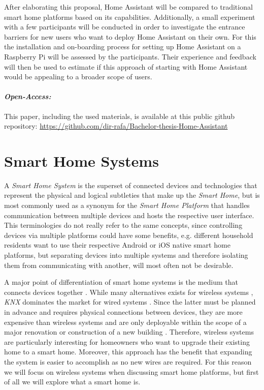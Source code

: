 After elaborating this proposal, Home Assistant will be compared to traditional smart home platforms based on its capabilities. Additionally, a small experiment with a few participants will be conducted in order to investigate the entrance barriers for new users who want to deploy Home Assistant on their own. For this the installation and on-boarding process for setting up Home Assistant on a Raspberry Pi will be assessed by the participants. Their experience and feedback will then be used to estimate if this approach of starting with Home Assistant would be appealing to a broader scope of users.

\paragraph{\textit{Open-Access:}}
\label{thesis:github_repo}
This paper, including the used materials, is available at this public github repository: \href{https://github.com/dir-rafa/Bachelor-thesis-Home-Assistant}{https://github.com/dir-rafa/Bachelor-thesis-Home-Assistant}

\newpage


\section{Smart Home Systems}
A \textit{Smart Home System} is the superset of connected devices and technologies that represent the physical and logical subtleties that make up the \textit{Smart Home}, but is most commonly used as a synonym for the \textit{Smart Home Platform} that handles communication between multiple devices and hosts the respective user interface.
This terminologies do not really refer to the same concepts, since controlling devices via multiple platforms could have some benefits, e.g. different household residents want to use their respective Android or iOS native smart home platforms, but separating devices into multiple systems and therefore isolating them from communicating with another, will most often not be desirable.

A major point of differentiation of smart home systems is the medium that connects devices together \cite{ReviewOfSmartHomes-6177682}. While many alternatives exists for wireless systems \cite{ReviewOfSmartHomes-6177682}, \textit{KNX} dominates the market for wired systems \cite{BertkoChris2017HSH:}. Since the latter must be planned in advance and requires physical connections between devices, they are more expensive than wireless systems and are only deployable within the scope of a major renovation or construction of a new building \cite{BertkoChris2017HSH:}. Therefore, wireless systems are particularly interesting for homeowners who want to upgrade their existing home to a smart home. Moreover, this approach has the benefit that expanding the system is easier to accomplish as no new wires are required. For this reason we will focus on wireless systems when discussing smart home platforms, but first of all we will explore what a smart home is.

